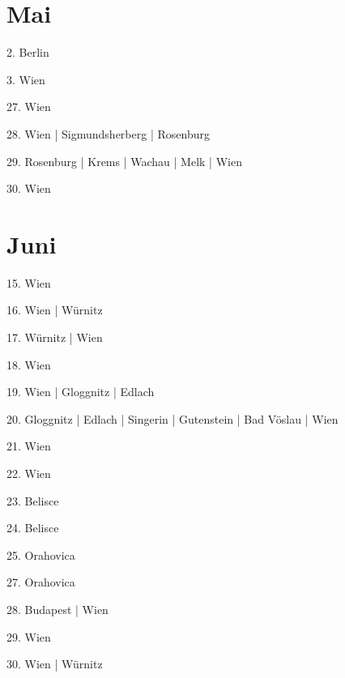 \documentclass[twoside=false,titlepage=false,open=any, parskip=never, fontsize=10pt, headings=small, chapterprefix=false, appendixprefix=false, DIV=15]{scrbook}
\begin{document}
\begin{multicols}{3}
            \section*{Mai}
            2. Berlin\par
            3. Wien\par
            27. Wien\par
            28. Wien | Sigmundsherberg | Rosenburg\par
            29. Rosenburg | Krems | Wachau | Melk | Wien\par
            30. Wien\par
            \section*{Juni}
            15. Wien\par
            16. Wien | Würnitz\par
            17. Würnitz | Wien\par
            18. Wien\par
            19. Wien | Gloggnitz | Edlach\par
            20. Gloggnitz | Edlach | Singerin | Gutenstein | Bad Vöslau | Wien\par
            21. Wien\par
            22. Wien\par
            23. Belisce\par
            24. Belisce\par
            25. Orahovica\par
            27. Orahovica\par
            28. Budapest | Wien\par
            29. Wien\par
            30. Wien | Würnitz\par

\end{multicols}
\end{document}

